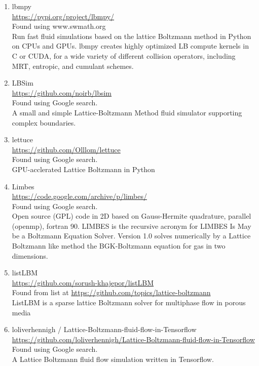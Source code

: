\documentclass{article}
\begin{document}
\begin{enumerate}
	\item lbmpy \\
	\href{https://pypi.org/project/lbmpy/}{https://pypi.org/project/lbmpy/}\\
	Found using www.swmath.org \\
	Run fast fluid simulations based on the lattice Boltzmann method in Python on CPUs and GPUs. lbmpy creates highly optimized LB compute kernels in C or CUDA, for a wide variety of different collision operators, including MRT, entropic, and cumulant schemes.
	
	\item LBSim
	\\
	\href{https://github.com/noirb/lbsim}{https://github.com/noirb/lbsim}
	\\
	Found using Google search.\\
	A small and simple Lattice-Boltzmann Method fluid simulator supporting complex boundaries.
	
	\item lettuce
	\\
	\href{https://github.com/Olllom/lettuce}{https://github.com/Olllom/lettuce}
	\\
	Found using Google search.\\
	GPU-acclerated Lattice Boltzmann in Python
	
	\item Limbes
	\\
	\href{https://code.google.com/archive/p/limbes/}{https://code.google.com/archive/p/limbes/} \\
	Found using Google search.\\
	Open source (GPL) code in 2D based on Gauss-Hermite quadrature, parallel (openmp), fortran 90. LIMBES is the recursive acronym for LIMBES Is May be a Boltzmann Equation Solver. Version 1.0 solves numerically by a Lattice Boltzmann like method the BGK-Boltzmann equation for gas in two dimensions.
	
	\item listLBM
	\\
	\href{https://github.com/sorush-khajepor/listLBM}{https://github.com/sorush-khajepor/listLBM} \\
	Found from list at \href{https://github.com/topics/lattice-boltzmann}{https://github.com/topics/lattice-boltzmann}\\
	ListLBM is a sparse lattice Boltzmann solver for multiphase flow in porous media
	
	\item  loliverhennigh /
	Lattice-Boltzmann-fluid-flow-in-Tensorflow 
	\\
	\href{https://github.com/loliverhennigh/Lattice-Boltzmann-fluid-flow-in-Tensorflow}{https://github.com/loliverhennigh/Lattice-Boltzmann-fluid-flow-in-Tensorflow}
	\\
	Found using Google search.\\
	A Lattice Boltzmann fluid flow simulation written in Tensorflow. 
	

\end{enumerate}
\end{document}
